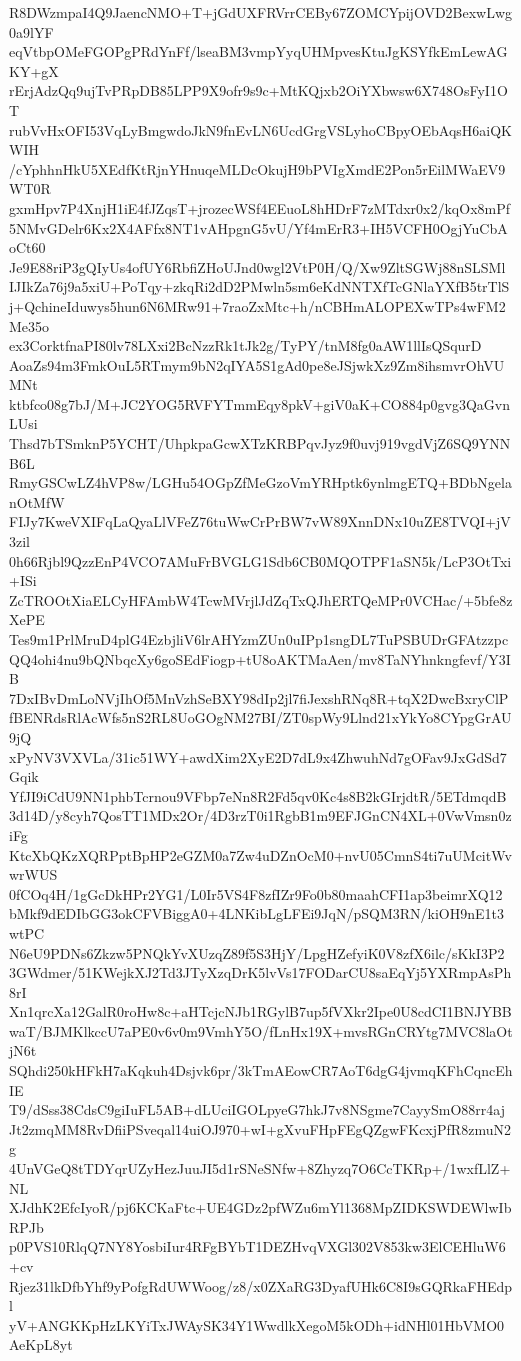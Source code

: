 R8DWzmpaI4Q9JaencNMO+T+jGdUXFRVrrCEBy67ZOMCYpijOVD2BexwLwg0a9lYF
eqVtbpOMeFGOPgPRdYnFf/lseaBM3vmpYyqUHMpvesKtuJgKSYfkEmLewAGKY+gX
rErjAdzQq9ujTvPRpDB85LPP9X9ofr9s9c+MtKQjxb2OiYXbwsw6X748OsFyI1OT
rubVvHxOFI53VqLyBmgwdoJkN9fnEvLN6UcdGrgVSLyhoCBpyOEbAqsH6aiQKWIH
/cYphhnHkU5XEdfKtRjnYHnuqeMLDcOkujH9bPVIgXmdE2Pon5rEilMWaEV9WT0R
gxmHpv7P4XnjH1iE4fJZqsT+jrozecWSf4EEuoL8hHDrF7zMTdxr0x2/kqOx8mPf
5NMvGDelr6Kx2X4AFfx8NT1vAHpgnG5vU/Yf4mErR3+IH5VCFH0OgjYuCbAoCt60
Je9E88riP3gQIyUs4ofUY6RbfiZHoUJnd0wgl2VtP0H/Q/Xw9ZltSGWj88nSLSMl
IJIkZa76j9a5xiU+PoTqy+zkqRi2dD2PMwln5sm6eKdNNTXfTcGNlaYXfB5trTlS
j+QchineIduwys5hun6N6MRw91+7raoZxMtc+h/nCBHmALOPEXwTPs4wFM2Me35o
ex3CorktfnaPI80lv78LXxi2BcNzzRk1tJk2g/TyPY/tnM8fg0aAW1llIsQSqurD
AoaZs94m3FmkOuL5RTmym9bN2qIYA5S1gAd0pe8eJSjwkXz9Zm8ihsmvrOhVUMNt
ktbfco08g7bJ/M+JC2YOG5RVFYTmmEqy8pkV+giV0aK+CO884p0gvg3QaGvnLUsi
Thsd7bTSmknP5YCHT/UhpkpaGcwXTzKRBPqvJyz9f0uvj919vgdVjZ6SQ9YNNB6L
RmyGSCwLZ4hVP8w/LGHu54OGpZfMeGzoVmYRHptk6ynlmgETQ+BDbNgelanOtMfW
FIJy7KweVXIFqLaQyaLlVFeZ76tuWwCrPrBW7vW89XnnDNx10uZE8TVQI+jV3zil
0h66Rjbl9QzzEnP4VCO7AMuFrBVGLG1Sdb6CB0MQOTPF1aSN5k/LcP3OtTxi+ISi
ZcTROOtXiaELCyHFAmbW4TcwMVrjlJdZqTxQJhERTQeMPr0VCHac/+5bfe8zXePE
Tes9m1PrlMruD4plG4EzbjliV6lrAHYzmZUn0uIPp1sngDL7TuPSBUDrGFAtzzpc
QQ4ohi4nu9bQNbqcXy6goSEdFiogp+tU8oAKTMaAen/mv8TaNYhnkngfevf/Y3IB
7DxIBvDmLoNVjIhOf5MnVzhSeBXY98dIp2jl7fiJexshRNq8R+tqX2DwcBxryClP
fBENRdsRlAcWfs5nS2RL8UoGOgNM27BI/ZT0spWy9Llnd21xYkYo8CYpgGrAU9jQ
xPyNV3VXVLa/31ic51WY+awdXim2XyE2D7dL9x4ZhwuhNd7gOFav9JxGdSd7Gqik
YfJI9iCdU9NN1phbTcrnou9VFbp7eNn8R2Fd5qv0Kc4s8B2kGIrjdtR/5ETdmqdB
3d14D/y8cyh7QosTT1MDx2Or/4D3rzT0i1RgbB1m9EFJGnCN4XL+0VwVmsn0ziFg
KtcXbQKzXQRPptBpHP2eGZM0a7Zw4uDZnOcM0+nvU05CmnS4ti7uUMcitWvwrWUS
0fCOq4H/1gGcDkHPr2YG1/L0Ir5VS4F8zfIZr9Fo0b80maahCFI1ap3beimrXQ12
bMkf9dEDIbGG3okCFVBiggA0+4LNKibLgLFEi9JqN/pSQM3RN/kiOH9nE1t3wtPC
N6eU9PDNs6Zkzw5PNQkYvXUzqZ89f5S3HjY/LpgHZefyiK0V8zfX6ilc/sKkI3P2
3GWdmer/51KWejkXJ2Td3JTyXzqDrK5lvVs17FODarCU8saEqYj5YXRmpAsPh8rI
Xn1qrcXa12GalR0roHw8c+aHTcjcNJb1RGylB7up5fVXkr2Ipe0U8cdCI1BNJYBB
waT/BJMKlkccU7aPE0v6v0m9VmhY5O/fLnHx19X+mvsRGnCRYtg7MVC8laOtjN6t
SQhdi250kHFkH7aKqkuh4Dsjvk6pr/3kTmAEowCR7AoT6dgG4jvmqKFhCqncEhIE
T9/dSss38CdsC9giIuFL5AB+dLUciIGOLpyeG7hkJ7v8NSgme7CayySmO88rr4aj
Jt2zmqMM8RvDfiiPSveqal14uiOJ970+wI+gXvuFHpFEgQZgwFKcxjPfR8zmuN2g
4UnVGeQ8tTDYqrUZyHezJuuJI5d1rSNeSNfw+8Zhyzq7O6CcTKRp+/1wxfLlZ+NL
XJdhK2EfcIyoR/pj6KCKaFtc+UE4GDz2pfWZu6mYl1368MpZIDKSWDEWlwIbRPJb
p0PVS10RlqQ7NY8YosbiIur4RFgBYbT1DEZHvqVXGl302V853kw3ElCEHluW6+cv
Rjez31lkDfbYhf9yPofgRdUWWoog/z8/x0ZXaRG3DyafUHk6C8I9sGQRkaFHEdpl
yV+ANGKKpHzLKYiTxJWAySK34Y1WwdlkXegoM5kODh+idNHl01HbVMO0AeKpL8yt
